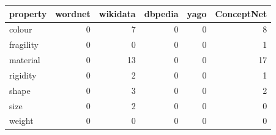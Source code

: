 \begin{tabular}{lrrrrr}
\toprule
property & wordnet & wikidata & dbpedia & yago & ConceptNet \\
\midrule
colour & 0 & 7 & 0 & 0 & 8 \\
fragility & 0 & 0 & 0 & 0 & 1 \\
material & 0 & 13 & 0 & 0 & 17 \\
rigidity & 0 & 2 & 0 & 0 & 1 \\
shape & 0 & 3 & 0 & 0 & 2 \\
size & 0 & 2 & 0 & 0 & 0 \\
weight & 0 & 0 & 0 & 0 & 0 \\
\bottomrule
\end{tabular}
